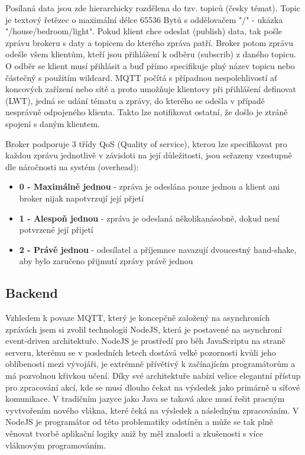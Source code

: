 Posílaná data jsou zde hierarchicky rozdělena do tzv. topiců (česky témat). Topic je textový řetězec o maximální délce 65536 Bytů s oddělovačem "/" - ukázka "/house/bedroom/light". Pokud klient chce odeslat (publish) data, tak pošle zprávu brokeru s daty a topicem do kterého zpráva patří. Broker potom zprávu odešle všem klientům, kteří jsou přihlášení k odběru (subscrib) z daného topicu. O odběr se klient musí přihlásit a buď přímo specifikuje plný název topicu nebo částečný s použitím wildcard. MQTT počítá s případnou nespolehlivostí ať koncových zařízení nebo sítě a proto umožňuje klientovy při přihlášení definovat  (LWT), jedná se udání tématu a zprávy, do kterého se odešla v případě nesprávně odpojeného klienta. Takto lze notifikovat ostatní, že došlo je ztráně spojení s daným klientem.

Broker podporuje 3 třídy QoS (Quality of service), kterou lze specifikovat pro každou zprávu jednotlivě v závisloti na její důležitosti, jsou seřazeny vzestupně dle náročnosti na systém (overhead):
\begin{itemize}
    \item \textbf{0 - Maximálně jednou} - zpráva je odeslána pouze jednou a klient ani broker nijak napotvrzují její přjetí
    \item \textbf{1 - Alespoň jednou} - zpráva je odeslaná několikanásobně, dokud není potvrzené její přijetí
    \item \textbf{2 - Právě jednou} - odesílatel a příjemnce navazují dvoucestný hand-shake, aby bylo zaručeno přijmutí zprávy právě jednou
\end{itemize}


\subsection{Backend}    %
Vzhledem k povaze MQTT, který je koncepčně založený na asynchroních zprávách jsem si zvolil technologii NodeJS, která je postavené na asynchroní event-driven architektuře. NodeJS je prostředí pro běh JavaScriptu na straně serveru, kterému se v posledních letech dostává velké pozornosti kvůli jeho oblíbenosti mezi vývojáři, je extrémně přívětivý k začínajícím programátorům a má pozvolnou křivkou učení. Díky své architektuře nabízí velice elegantní přístup pro zpracování akcí, kde se musí dlouho čekat na výsledek jako primárně u síťové komunikace. V tradičním jazyce jako Java se taková akce musí řešit pracným vyvtvořením nového vlákna, které čeká na výsledek a následným zpracováním. V NodeJS je programátor od této problematiky odstíněn a může se tak plně věnovat tvorbě aplikační logiky aniž by měl znalosti a zkušenosti s více vláknovým programováním.

